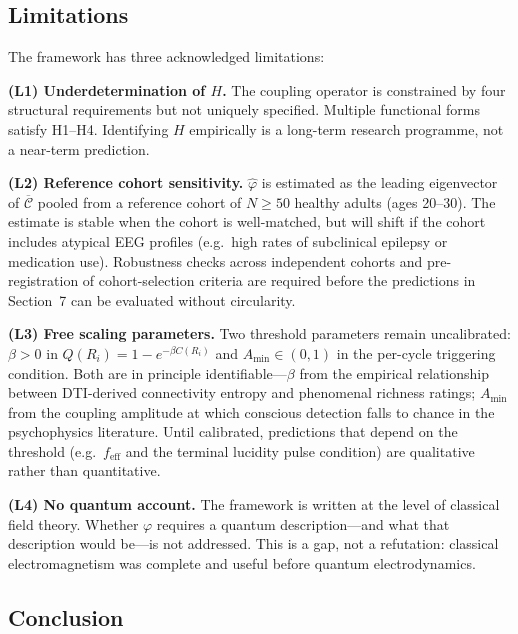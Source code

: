 \documentclass[12pt]{article}
\begin{document}
\subsection{Limitations}

The framework has three acknowledged limitations:

\textbf{(L1) Underdetermination of $H$.} The coupling operator is constrained by four structural requirements but not uniquely specified. Multiple functional forms satisfy H1--H4. Identifying $H$ empirically is a long-term research programme, not a near-term prediction.

\textbf{(L2) Reference cohort sensitivity.} $\hat{\varphi}$ is estimated as the leading eigenvector of $\overline{\mathcal{C}}$ pooled from a reference cohort of $N \geq 50$ healthy adults (ages 20--30). The estimate is stable when the cohort is well-matched, but will shift if the cohort includes atypical EEG profiles (e.g.\ high rates of subclinical epilepsy or medication use). Robustness checks across independent cohorts and pre-registration of cohort-selection criteria are required before the predictions in Section~7 can be evaluated without circularity.

\textbf{(L3) Free scaling parameters.} Two threshold parameters remain uncalibrated: $\beta > 0$ in $Q(R_i)=1-e^{-\beta C(R_i)}$ and $A_{\min}\in(0,1)$ in the per-cycle triggering condition. Both are in principle identifiable---$\beta$ from the empirical relationship between DTI-derived connectivity entropy and phenomenal richness ratings; $A_{\min}$ from the coupling amplitude at which conscious detection falls to chance in the psychophysics literature. Until calibrated, predictions that depend on the threshold (e.g.\ $f_{\mathrm{eff}}$ and the terminal lucidity pulse condition) are qualitative rather than quantitative.

\textbf{(L4) No quantum account.} The framework is written at the level of classical field theory. Whether $\varphi$ requires a quantum description---and what that description would be---is not addressed. This is a gap, not a refutation: classical electromagnetism was complete and useful before quantum electrodynamics.

\subsection{Conclusion}
\end{document}
